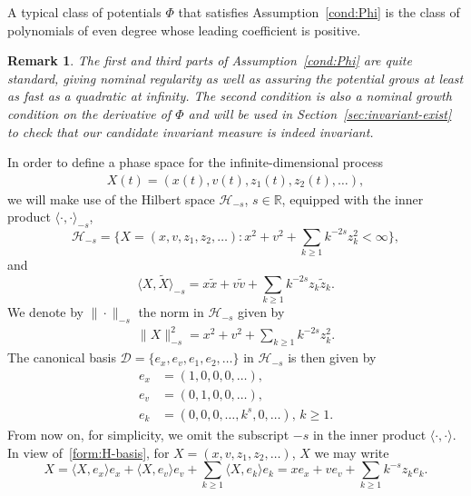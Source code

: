 \documentclass[11pt]{amsart}
\theoremstyle{definition}
\newcommand{\rbb}{\mathbb{R}}
\renewcommand{\H}{\mathcal{H}}
\newcommand{\la}{\langle}
\newcommand{\ra}{\rangle}
\newcommand{\wt}[1]{ \widetilde{#1} }
\theoremstyle{definition}
\theoremstyle{plain}
\newtheorem{remark}[theorem]{Remark}
\numberwithin{equation}{section}
\begin{document}
A typical class of potentials $\Phi$ that satisfies Assumption~\ref{cond:Phi} is the class of polynomials of even degree whose leading coefficient is positive.
\begin{remark}
The first and third parts of Assumption~\ref{cond:Phi} are quite standard, giving nominal regularity as well as assuring the potential grows at least as fast as a quadratic at infinity.  The second condition is also a nominal growth condition on the derivative of $\Phi$ and will be used in Section~\ref{sec:invariant-exist} to check that our candidate invariant measure is indeed invariant.    
\end{remark}

In order to define a phase space for the infinite-dimensional process 
\begin{align*}
X(t)=(x(t), v(t), z_1(t), z_2(t), \ldots), 
\end{align*}
we will make use of the Hilbert space $\H_{-s}$, $s\in \rbb$, equipped with the inner product $\la\cdot,\cdot\ra_{-s}$, 
 \begin{equation}\label{eqn:H_p}
\H_{-s}=\Big\{X=(x,v,z_1, z_2, \ldots):x^2+v^2+\sum_{k\geq 1}k^{-2s}z_k^2<\infty\Big\},
\end{equation}
and 
\begin{equation} \label{eqn:H-inner-prod}
\la X,\widetilde{X}\ra_{-s} = x\wt{x}+v\wt{v}+\sum_{k\geq 1}k^{-2s}z_k\wt{z}_k.
\end{equation}
We denote by $\| \cdot \|_{-s}$ the norm in $\H_{-s}$ given by 
\begin{align}\label{eqn:H-norm}
\|X\|_{-s}^2=x^2+v^2+\sum_{k\geq 1}k^{-2s}z_k^2. 
\end{align}
The canonical basis $\mathcal{D}=\{e_x,e_v,e_1,e_2,\dots\}$ in $\H_{-s}$ is then given by
\begin{equation} \label{form:H-basis}
\begin{aligned}
e_x&=(1,0,0,0,\dots),\\
e_v &=(0,1,0,0,\dots),\\
e_k & = (0,0,0,\dots,k^s,0,\dots),\, k\geq 1.
\end{aligned}
\end{equation}
From now on, for simplicity, we omit the subscript $-s$ in the inner product $\la\cdot,\cdot\ra$. In view of~\eqref{form:H-basis}, for $X=(x,v,z_1,z_2,\dots)$, $X$ we may write 
\begin{equation}\label{eqn:density-5}
X=\la X,e_x\ra e_x+\la X,e_v\ra e_v+\sum_{k\geq 1}\la X,e_k\ra e_k=  xe_x+ve_v+\sum_{k\geq 1}k^{-s}z_ke_k.
\end{equation}
\end{document}
